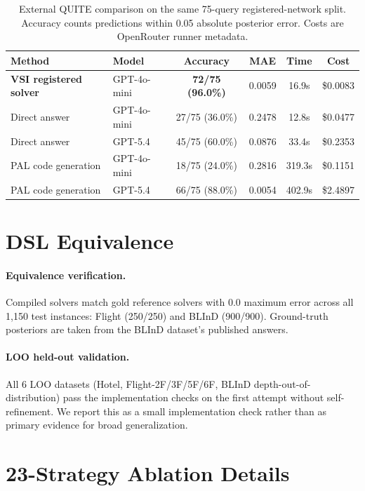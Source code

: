 \documentclass{article}
\begin{document}
\begin{table}[ht]
\centering
\small
\caption{External QUITE comparison on the same 75-query registered-network split. Accuracy counts predictions within 0.05 absolute posterior error. Costs are OpenRouter runner metadata.}
\label{tab:quite_external_detail}
\begin{tabular}{@{}llcccc@{}}
\toprule
Method & Model & Accuracy & MAE & Time & Cost \\
\midrule
\textbf{VSI registered solver} & GPT-4o-mini & \textbf{72/75 (96.0\%)} & 0.0059 & 16.9s & \$0.0083 \\
Direct answer & GPT-4o-mini & 27/75 (36.0\%) & 0.2478 & 12.8s & \$0.0477 \\
Direct answer & GPT-5.4 & 45/75 (60.0\%) & 0.0876 & 33.4s & \$0.2353 \\
PAL code generation & GPT-4o-mini & 18/75 (24.0\%) & 0.2816 & 319.3s & \$0.1151 \\
PAL code generation & GPT-5.4 & 66/75 (88.0\%) & 0.0054 & 402.9s & \$2.4897 \\
\bottomrule
\end{tabular}
\end{table}

\section{DSL Equivalence}
\label{app:equivalence}

\paragraph{Equivalence verification.}
Compiled solvers match gold reference solvers with 0.0 maximum error across all 1,150 test instances: Flight (250/250) and BLInD (900/900). Ground-truth posteriors are taken from the BLInD dataset's published answers.

\paragraph{LOO held-out validation.}
All 6 LOO datasets (Hotel, Flight-2F/3F/5F/6F, BLInD depth-out-of-distribution) pass the implementation checks on the first attempt without self-refinement. We report this as a small implementation check rather than as primary evidence for broad generalization.

\section{23-Strategy Ablation Details}
\label{app:strategies}
\end{document}
